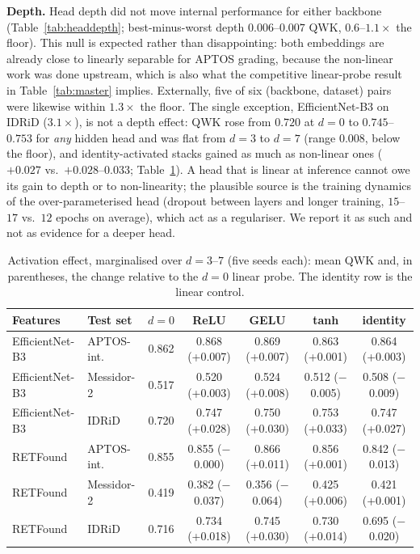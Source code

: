 \textbf{Depth.} Head depth did not move internal performance for either backbone
(Table~\ref{tab:headdepth}; best-minus-worst depth $0.006$--$0.007$ QWK, $0.6$--$1.1\times$
the floor). This null is expected rather than disappointing: both embeddings are
already close to linearly separable for APTOS grading, because the non-linear work
was done upstream, which is also what the competitive linear-probe result in
Table~\ref{tab:master} implies. Externally, five of six (backbone, dataset) pairs
were likewise within $1.3\times$ the floor. The single exception, EfficientNet-B3
on IDRiD ($3.1\times$), is not a depth effect: QWK rose from $0.720$ at $d=0$ to
$0.745$--$0.753$ for \emph{any} hidden head and was flat from $d=3$ to $d=7$
(range $0.008$, below the floor), and identity-activated stacks gained as much as
non-linear ones ($+0.027$ vs.\ $+0.028$--$0.033$; Table~\ref{tab:headact}). A
head that is linear at inference cannot owe its gain to depth or to non-linearity;
the plausible source is the training dynamics of the over-parameterised head
(dropout between layers and longer training, $15$--$17$ vs.\ $12$ epochs on average),
which act as a regulariser. We report it as such and not as evidence for a deeper
head.

\begin{table}[!t]
\centering\footnotesize
\caption{Activation effect, marginalised over $d=3$--$7$ (five seeds each):
mean QWK and, in parentheses, the change relative to the $d=0$ linear probe. The
identity row is the linear control.}
\label{tab:headact}
\setlength{\tabcolsep}{5pt}
\begin{tabular}{llccccc}
\toprule
Features & Test set & $d=0$ & ReLU & GELU & tanh & identity \\
\midrule
EfficientNet-B3 & APTOS-int. & 0.862 & 0.868 (+0.007) & 0.869 (+0.007) & 0.863 (+0.001) & 0.864 (+0.003) \\
EfficientNet-B3 & Messidor-2 & 0.517 & 0.520 (+0.003) & 0.524 (+0.008) & 0.512 ($-$0.005) & 0.508 ($-$0.009) \\
EfficientNet-B3 & IDRiD & 0.720 & 0.747 (+0.028) & 0.750 (+0.030) & 0.753 (+0.033) & 0.747 (+0.027) \\
\midrule
RETFound & APTOS-int. & 0.855 & 0.855 ($-$0.000) & 0.866 (+0.011) & 0.856 (+0.001) & 0.842 ($-$0.013) \\
RETFound & Messidor-2 & 0.419 & 0.382 ($-$0.037) & 0.356 ($-$0.064) & 0.425 (+0.006) & 0.421 (+0.001) \\
RETFound & IDRiD & 0.716 & 0.734 (+0.018) & 0.745 (+0.030) & 0.730 (+0.014) & 0.695 ($-$0.020) \\
\bottomrule
\end{tabular}
\end{table}

